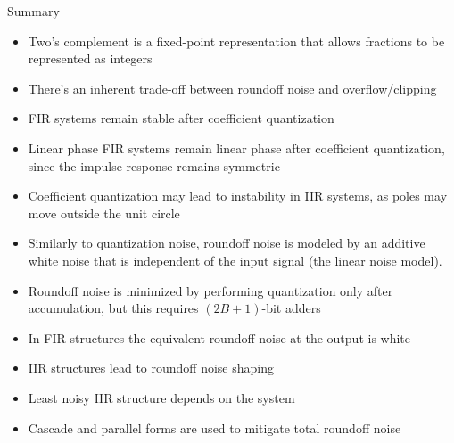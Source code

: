 \documentclass[10pt, handout]{beamer}
\begin{document}
%
\begin{frame}{Summary}
\begin{itemize}
	\item Two's complement is a fixed-point representation that allows fractions to be represented as integers
	\item There's an inherent trade-off between roundoff noise and overflow/clipping
	\item FIR systems remain stable after coefficient quantization
	\item Linear phase FIR systems remain linear phase after coefficient quantization, since the impulse response remains symmetric
	\item Coefficient quantization may lead to instability in IIR systems, as poles may move outside the unit circle
	\item Similarly to quantization noise, roundoff noise is modeled by an additive white noise that is independent of the input signal (the linear noise model).
	\item Roundoff noise is minimized by performing quantization only after accumulation, but this requires $(2B+1)$-bit adders
	\item In FIR structures the equivalent roundoff noise at the output is white
	\item IIR structures lead to roundoff noise shaping
	\item Least noisy IIR structure depends on the system
	\item Cascade and parallel forms are used to mitigate total roundoff noise
\end{itemize}
\end{frame}
\end{document}
